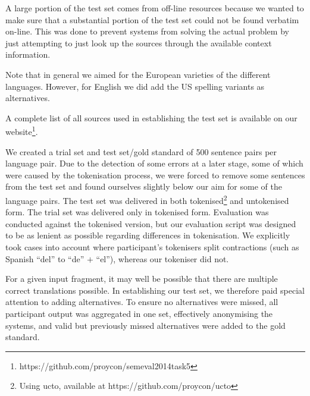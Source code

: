 A large portion of the test set comes from off-line resources because we wanted
to make sure that a substantial portion of the test set could not be found
verbatim on-line. This was done to prevent systems from solving the actual
problem by just attempting to just look up the sources through the available
context information.

Note that in general we aimed for the European varieties of the different
languages. However, for English we did add the US spelling variants as
alternatives.

A complete list of all sources used in establishing the test set is available on our website\footnote{https://github.com/proycon/semeval2014task5}.


We created a trial set and test set/gold standard of 500 sentence pairs per
language pair. Due to the detection of some errors at a later stage, some of
which were caused by the tokenisation process, we were forced to remove some
sentences from the test set and found ourselves slightly below our aim for some
of the language pairs. The test set was delivered in both
tokenised\footnote{Using ucto, available at https://github.com/proycon/ucto}
and untokenised form. The trial set was delivered only in tokenised form.
Evaluation was conducted against the tokenised version, but our evaluation
script was designed to be as lenient as possible regarding differences in
tokenisation. We explicitly took cases into account where participant's
tokenisers split contractions (such as Spanish ``del'' to ``de'' $+$ ``el''),
whereas our tokeniser did not.

For a given input fragment, it may well be possible that there are multiple
correct translations possible. In establishing our test set, we therefore paid
special attention to adding alternatives. To ensure no alternatives were
missed, all participant output was aggregated in one set, effectively
anonymising the systems, and valid but previously missed alternatives were
added to the gold standard.


